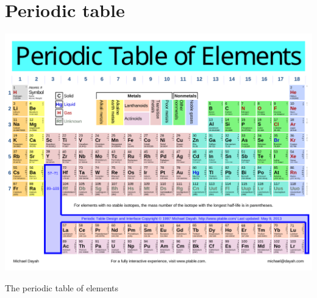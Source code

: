 \section{Periodic table}
\begin{table}[ht!]
    \centering
    \includegraphics[height=0.9\linewidth,angle=90]{images/Periodic_Table.pdf}
    \caption{The periodic table of elements}
    \label{tab:app_periodictable}
\end{table}

